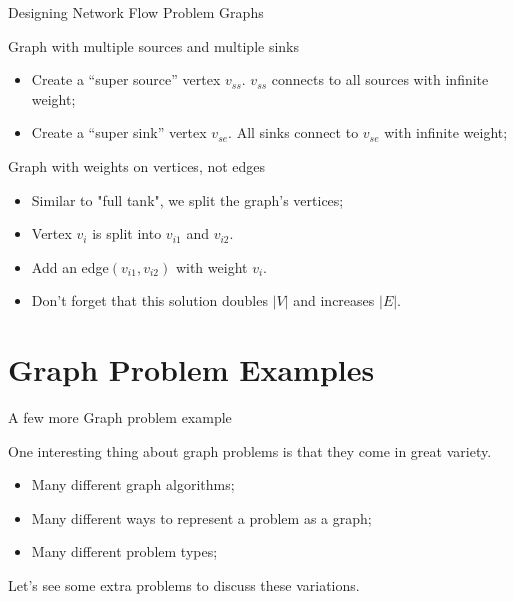 \begin{frame}{Designing Network Flow Problem Graphs}
  \begin{block}{Graph with multiple sources and multiple sinks}
  \begin{itemize}
  \item Create a ``super source'' vertex $v_{ss}$. $v_{ss}$ connects to all sources with infinite weight;
  \item Create a ``super sink'' vertex $v_{se}$. All sinks connect to $v_{se}$ with infinite weight;
  \end{itemize}
  \end{block}


  \begin{block}{Graph with weights on vertices, not edges}
    \begin{itemize}
    \item Similar to "full tank", we split the graph's vertices;
    \item Vertex $v_i$ is split into $v_{i1}$ and $v_{i2}$.
    \item Add an edge$(v_{i1}, v_{i2})$ with weight $v_i$.
    \item Don't forget that this solution doubles $|V|$ and increases $|E|$.
    \end{itemize}
  \end{block}
\end{frame}

\section{Graph Problem Examples}

\begin{frame}{A few more Graph problem example}

  One interesting thing about graph problems is that they come in great variety.\bigskip

  \begin{itemize}
    \item Many different graph algorithms;
    \item Many different ways to represent a problem as a graph;
    \item Many different problem types;
  \end{itemize}\bigskip

  Let's see some extra problems to discuss these variations.
\end{frame}

